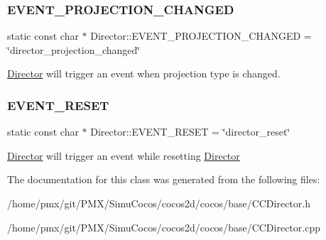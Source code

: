\subsubsection{\texorpdfstring{E\+V\+E\+N\+T\+\_\+\+P\+R\+O\+J\+E\+C\+T\+I\+O\+N\+\_\+\+C\+H\+A\+N\+G\+ED}{EVENT\_PROJECTION\_CHANGED}}
{\footnotesize\ttfamily static const char $\ast$ Director\+::\+E\+V\+E\+N\+T\+\_\+\+P\+R\+O\+J\+E\+C\+T\+I\+O\+N\+\_\+\+C\+H\+A\+N\+G\+ED = \char`\"{}director\+\_\+projection\+\_\+changed\char`\"{}\hspace{0.3cm}{\ttfamily [static]}}

\hyperlink{classDirector}{Director} will trigger an event when projection type is changed. \mbox{\label{classDirector_a4689f4e4daf5179fc590f0af2f9ac554}} 
\subsubsection{\texorpdfstring{E\+V\+E\+N\+T\+\_\+\+R\+E\+S\+ET}{EVENT\_RESET}}
{\footnotesize\ttfamily static const char $\ast$ Director\+::\+E\+V\+E\+N\+T\+\_\+\+R\+E\+S\+ET = \char`\"{}director\+\_\+reset\char`\"{}\hspace{0.3cm}{\ttfamily [static]}}

\hyperlink{classDirector}{Director} will trigger an event while resetting \hyperlink{classDirector}{Director} 

The documentation for this class was generated from the following files\+:\begin{DoxyCompactItemize}
\item 
/home/pmx/git/\+P\+M\+X/\+Simu\+Cocos/cocos2d/cocos/base/C\+C\+Director.\+h\item 
/home/pmx/git/\+P\+M\+X/\+Simu\+Cocos/cocos2d/cocos/base/C\+C\+Director.\+cpp\end{DoxyCompactItemize}
